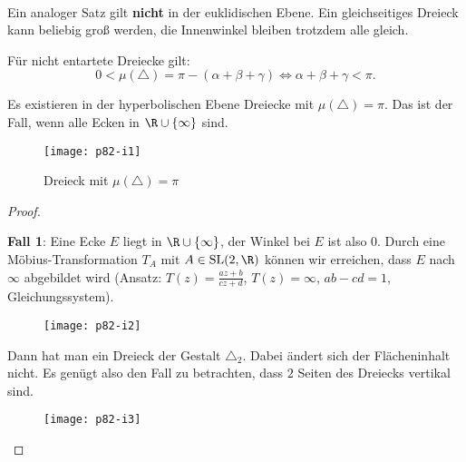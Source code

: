\begin{remark}
  \ 
  \begin{enumerate}
    \item Ein analoger Satz gilt \textbf{nicht} in der euklidischen Ebene. Ein gleichseitiges Dreieck kann beliebig groß werden, die Innenwinkel bleiben trotzdem alle gleich.
    \item Für nicht entartete Dreiecke gilt:
    \begin{equation*}
      0 < \mu(\triangle) = \pi - (\alpha + \beta + \gamma) \Leftrightarrow \alpha + \beta + \gamma < \pi\text{.}
    \end{equation*}

    \begin{minipage}{.475\textwidth}
      \item Es existieren in der hyperbolischen Ebene Dreiecke mit \( \mu(\triangle) = \pi \). Das ist der Fall, wenn alle Ecken in \( \R \cup \left \{ \infty \right \} \) sind.
    \end{minipage}
    \hfill
    \begin{minipage}{.475\textwidth}
      \begin{figure}[H]
        \texttt{[image: p82-i1]}
        \caption{Dreieck mit \( \mu(\triangle) = \pi \)}
      \end{figure}
    \end{minipage}
    \begin{proof}
      \ \\
      \begin{minipage}{.475\textwidth}
        \textbf{Fall 1}: Eine Ecke \( E \) liegt in \( \R \cup \left \{ \infty \right \} \), der Winkel bei \( E \) ist also \(  0 \). Durch eine Möbius-Transformation \( T_A \) mit \( A \in \text{SL}(2,\R) \) können wir erreichen, dass \( E \) nach \( \infty \) abgebildet wird (Ansatz: \( T(z) = \frac{az + b}{cz + d} \), \( T(z) = \infty \), \( ab - cd = 1 \), Gleichungssystem).
      \end{minipage}
      \hfill
      \begin{minipage}{.475\textwidth}
        \begin{figure}[H]
          \texttt{[image: p82-i2]}
        \end{figure}
      \end{minipage}

      \begin{minipage}{.475\textwidth}
        Dann hat man ein Dreieck der Gestalt \( \triangle_2 \). Dabei ändert sich der Flächeninhalt nicht. Es genügt also den Fall zu betrachten, dass \( 2 \) Seiten des Dreiecks vertikal sind.
      \end{minipage}
      \hfill
      \begin{minipage}{.475\textwidth}
        \begin{figure}[H]
          \texttt{[image: p82-i3]}
        \end{figure}
      \end{minipage}



\end{proof}
\end{enumerate}
\end{remark}
